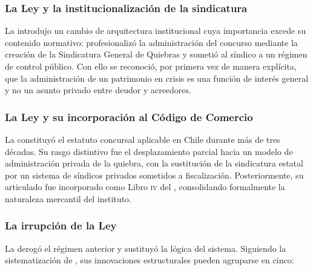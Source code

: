 \subsubsection{La Ley  y la institucionalización de la sindicatura}

La  \citeyearpar{ley-4558} introdujo un cambio de arquitectura institucional
cuya importancia
excede su contenido normativo: profesionalizó la administración del concurso mediante la
creación de la Sindicatura General de Quiebras y sometió al síndico a un régimen de
control público. Con
ello se reconoció, por primera vez de manera explícita, que la administración de un
patrimonio en crisis es una función de interés general y no un asunto privado entre
deudor y acreedores.

\subsubsection{La Ley  y su incorporación al Código de Comercio}

La  \citeyearpar{ley-18175} constituyó el estatuto concursal aplicable en
Chile durante más de tres décadas. Su rasgo distintivo fue el desplazamiento parcial hacia un modelo de
administración privada de la quiebra, con la sustitución de la sindicatura estatal por un
sistema de síndicos privados sometidos a fiscalización.
Posteriormente, su articulado fue incorporado como Libro \textsc{iv} del \ccom{},
consolidando formalmente la naturaleza mercantil del instituto.

\subsubsection{La irrupción de la Ley }

La \LIR{} \citeyearpar{ley-20720} derogó el régimen anterior y sustituyó la lógica del
sistema. Siguiendo la sistematización de \textcite{aj-texto-refundido}, sus innovaciones
estructurales pueden agruparse en cinco:

